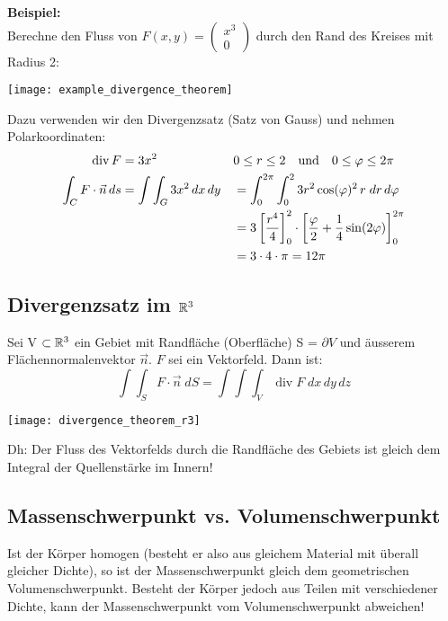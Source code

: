 \begin{minipage}{0.75\columnwidth}
	\textbf{Beispiel:}\\
	Berechne den Fluss von 
	$F(x, y) = 
	\left(
	\begin{array}{c}
		x^3\\
		0 
	\end{array}\right)$
	durch den Rand des Kreises mit Radius 2:
\end{minipage}
\begin{minipage}{0.24\columnwidth}
	\texttt{[image: example\_divergence\_theorem]}
\end{minipage}
Dazu verwenden wir den Divergenzsatz (Satz von Gauss) und nehmen Polarkoordinaten:
\begin{align*}
	\operatorname{div} F &= 3x^2 && 0 \leq r \leq 2 \hspace{10pt} \text{und} \hspace{10pt} 0 \leq \varphi \leq 2\pi \\
	\int_{C} F \cdot \vec{n} \, ds &= 
	\int\int_G 3x^2 \, dx \, dy &&= 
	\int_0^{2\pi} \int_0^2 3 r^2 \cos(\varphi)^2 \, r \; dr \, d\varphi \\
	& &&= 3 \left[ \frac{r^4}{4} \right]_0^2 \cdot \left[ \frac{\varphi}{2} + \frac{1}{4} \sin(2\varphi) \right]_0^{2\pi} \\
	& &&= 3 \cdot 4 \cdot \pi = 12 \pi
\end{align*}
 
\subsection{Divergenzsatz im $\mathbb{R}^3$}
\begin{minipage}{0.68\columnwidth}
	Sei V $\subset \mathbb{R}^3$ ein Gebiet mit Randfläche (Oberfläche) S = $\partial V$ und äusserem Flächennormalenvektor $\vec{n}$. $F$ sei ein Vektorfeld. Dann ist:
	\[
		\int \int_S F \cdot \vec{n} \; dS = \int \int \int_V \operatorname{div} F \; dx \, dy \, dz
	\]	
\end{minipage}
\begin{minipage}{0.31\columnwidth}
	\texttt{[image: divergence\_theorem\_r3]}
\end{minipage}
Dh: Der Fluss des Vektorfelds durch die Randfläche des Gebiets ist gleich dem Integral der Quellenstärke im Innern!

\subsection{Massenschwerpunkt vs. Volumenschwerpunkt}
Ist der Körper homogen (besteht er also aus gleichem Material mit überall gleicher Dichte), so ist der Massenschwerpunkt gleich dem geometrischen Volumenschwerpunkt. Besteht der Körper jedoch aus Teilen mit verschiedener Dichte, kann der Massenschwerpunkt vom Volumenschwerpunkt abweichen!

